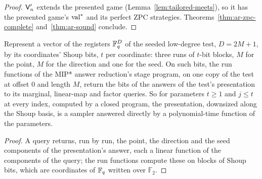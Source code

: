 \begin{proof}
\leanok
$\mathsf{V}'_n$ extends the presented game (Lemma~\ref{lem:tailored-meets}), so it has the
presented game's $\mathrm{val}^*$ and its perfect ZPC strategies. Theorems~\ref{thm:ar-zpc-complete}
and~\ref{thm:ar-sound} conclude.
\end{proof}

\begin{lemma}
\label{lem:ar-ld-direct}
\leanok
Represent a vector of the registers $\mathbb{F}_q^{D}$ of the seeded low-degree test, $D = 2M + 1$, by
its coordinates' Shoup bits, $t$ per coordinate: three runs of $t$-bit blocks, $M$ for the point,
$M$ for the direction and one for the seed. On such bits, the run functions of the MIP* answer
reduction's stage program, on one copy of the test at offset $0$ and length $M$, return the bits
of the answers of the test's presentation to its marginal, linear-map and factor queries. So for
parameters $t \geq 1$ and $j \leq t$ at every index, computed by a closed program, the
presentation, downsized along the Shoup basis, is a sampler answered directly by a
polynomial-time function of the parameters.
\end{lemma}

\begin{proof}
\leanok
A query returns, run by run, the point, the direction and the seed components of the
presentation's answer, each a linear function of the components of the query; the run functions
compute these on blocks of Shoup bits, which are coordinates of $\mathbb{F}_q$ written over $\mathbb{F}_2$.
\end{proof}

